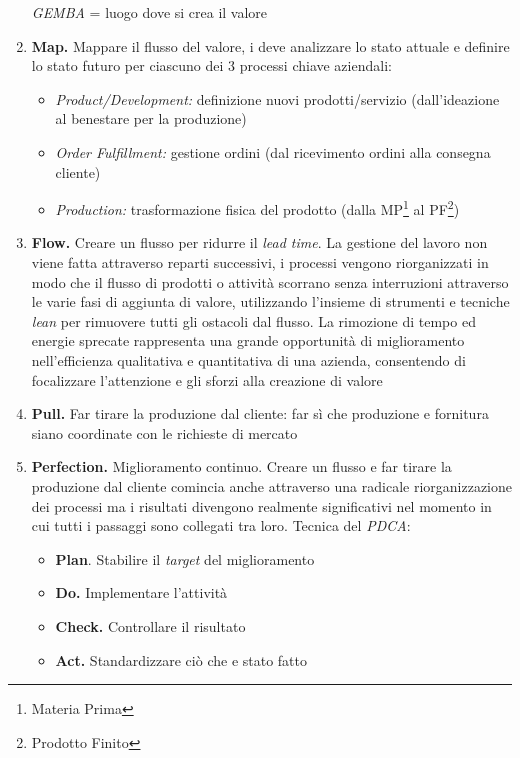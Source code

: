 \begin{enumerate}
		\textit{GEMBA} = luogo dove si crea il valore
	\item \textbf{Map.} Mappare il flusso del valore, i deve analizzare lo stato attuale e definire lo stato futuro per ciascuno dei 3 processi chiave aziendali:
		\begin{itemize}
			\item \textit{Product/Development:} definizione nuovi prodotti/servizio (dall’ideazione al benestare per la produzione)
			\item \textit{Order Fulfillment:} gestione ordini (dal ricevimento ordini alla consegna cliente)
			\item \textit{Production:} trasformazione fisica del prodotto (dalla MP\footnote{ Materia Prima} al PF\footnote{ Prodotto Finito})
		\end{itemize}
	\item \textbf{Flow.} Creare un flusso per ridurre il \textit{lead time}. La gestione del lavoro non viene fatta attraverso reparti successivi, i processi vengono riorganizzati in modo che il flusso di prodotti o attività scorrano senza interruzioni attraverso le varie fasi di aggiunta di valore, utilizzando l’insieme di strumenti e tecniche \textit{lean} per rimuovere tutti gli ostacoli dal flusso. La rimozione di tempo ed energie sprecate rappresenta una grande opportunità di miglioramento nell’efficienza qualitativa e quantitativa di una azienda, consentendo di focalizzare l’attenzione e gli sforzi alla creazione di valore
	\item \textbf{Pull.} Far tirare la produzione dal cliente: far sì che produzione e fornitura siano coordinate con le richieste di mercato
	\item \textbf{Perfection.} Miglioramento continuo. Creare un flusso e far tirare la produzione dal cliente comincia anche attraverso una radicale riorganizzazione dei processi ma i risultati divengono realmente significativi nel momento in cui tutti i passaggi sono collegati tra loro. Tecnica del \textit{PDCA}:
		\begin{itemize}
			\item \textbf{Plan}. Stabilire il \textit{target} del miglioramento
			\item \textbf{Do.} Implementare l’attività
			\item \textbf{Check.} Controllare il risultato
			\item \textbf{Act.} Standardizzare ciò che e stato fatto
		\end{itemize}
\end{enumerate}






